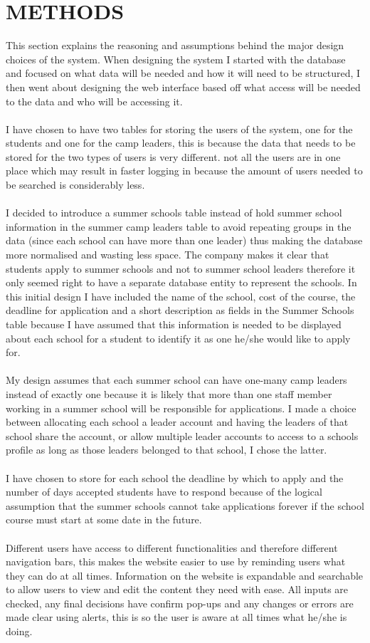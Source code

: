 \documentclass{project}
\begin{document}
\section{METHODS}
This section explains the reasoning and assumptions behind the major design choices of the system.
When designing the system I started with the database and focused on what data will be needed and how it will need to be structured, I then went about designing the web interface based off what access will be needed to the data and who will be accessing it. 
\\\\
I have chosen to have two tables for storing the users of the system, one for the students and one for the camp leaders, this is because the data that needs to be stored for the two types of users is very different. not all the users are in one place which may result in faster logging in because the amount of users needed to be searched is considerably less.
\\\\ 
I decided to introduce a summer schools table instead of hold summer school information in the summer camp leaders table to avoid repeating groups in the data (since each school can have more than one leader) thus making the database more normalised and wasting less space. The company makes it clear that students  apply to summer schools and not to summer school leaders therefore it only seemed right to have a separate database entity to represent the schools. In this initial design I have included the name of the school, cost of the course, the deadline for application and a short description as fields in the Summer Schools table because I have assumed that this information is needed to be displayed about each school for a student to identify it as one he/she would like to apply for.
\\\\
My design assumes that each summer school can have one-many camp leaders instead of exactly one because it is likely that more than one staff member working in a summer school will be responsible for applications. I made a choice between allocating each school a leader account and having the leaders of that school share the account, or allow multiple leader accounts to access to a schools profile as long as those leaders belonged to that school, I chose the latter.
\\\\
I have chosen to store for each school the deadline by which to apply and the number of days accepted students have to respond because of the logical assumption that the summer schools cannot take applications forever if the school course must start at some date in the future. 
\\\\
Different users have access to different functionalities and therefore different navigation bars, this makes the website easier to use by reminding users what they can do at all times.
Information on the website is expandable and searchable to allow users to view and edit the content they need with ease. All inputs are checked, any final decisions have confirm pop-ups and any changes or errors are made clear using alerts, this is so the user is aware at all times what he/she is doing.
\newpage
\end{document}
